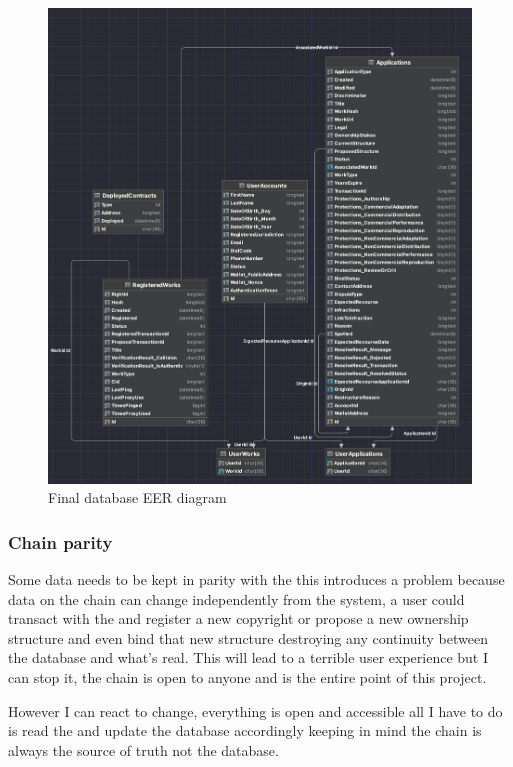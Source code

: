 \begin{figure}[H]
\caption{Final database EER diagram}
\centering
\includegraphics[width=\textwidth,height=0.7\textheight,keepaspectratio]{images/patterns/database}
\end{figure}

\subsubsection{Chain parity}
\label{sec:chain-parity}

Some data needs to be kept in parity with the  this introduces a problem because data on the chain can change independently from the system, a user could transact with the  and register a new copyright or propose a new ownership structure and even bind that new structure destroying any continuity between the database and what's real. This will lead to a terrible user experience but I can stop it, the chain is open to anyone and is the entire point of this project.

However I can react to change, everything is open and accessible all I have to do is read the  and update the database accordingly keeping in mind the chain is always the source of truth not the database.

